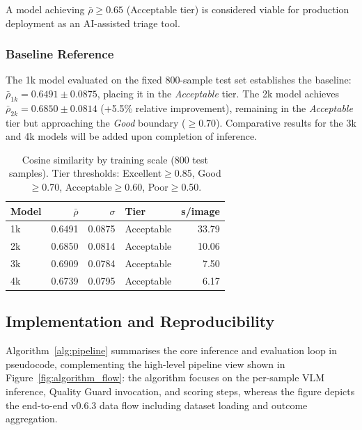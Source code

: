 \documentclass[twocolumn]{article}
\begin{document}
A model achieving $\bar{\rho} \geq 0.65$ (Acceptable tier) is considered
viable for production deployment as an AI-assisted triage tool.

\subsubsection{Baseline Reference}

The 1k model evaluated on the fixed 800-sample test set establishes the
baseline: $\bar{\rho}_{1k} = 0.6491 \pm 0.0875$, placing it in the
\textit{Acceptable} tier.
The 2k model achieves $\bar{\rho}_{2k} = 0.6850 \pm 0.0814$
(+5.5\% relative improvement), remaining in the \textit{Acceptable} tier
but approaching the \textit{Good} boundary ($\geq 0.70$).
Comparative results for the 3k and 4k models will be added upon
completion of inference.

\begin{table}[h]
\centering
\caption{Cosine similarity by training scale (800 test samples).
         Tier thresholds: Excellent$\geq$0.85, Good$\geq$0.70,
         Acceptable$\geq$0.60, Poor$\geq$0.50.}
\label{tab:results}
\setlength{\tabcolsep}{5pt}
\begin{tabular}{lrrlr}
\toprule
Model & $\bar{\rho}$ & $\sigma$ & Tier & s/image \\
\midrule
1k & 0.6491 & 0.0875 & Acceptable & 33.79 \\
2k & 0.6850 & 0.0814 & Acceptable & 10.06 \\
3k & 0.6909 & 0.0784 & Acceptable & 7.50 \\
4k & 0.6739 & 0.0795 & Acceptable & 6.17 \\
\bottomrule
\end{tabular}
\end{table}

\subsection{Implementation and Reproducibility}
\label{sec:implementation}

Algorithm~\ref{alg:pipeline} summarises the core inference and evaluation
loop in pseudocode, complementing the high-level pipeline view shown in
Figure~\ref{fig:algorithm_flow}: the algorithm focuses on the per-sample
VLM inference, Quality Guard invocation, and scoring steps, whereas the
figure depicts the end-to-end v0.6.3 data flow including dataset loading
and outcome aggregation.
\end{document}
